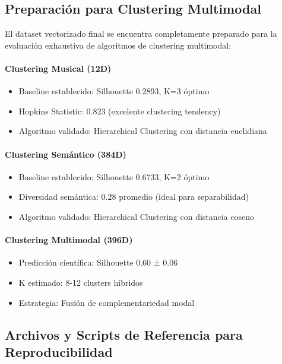 \documentclass[12pt,a4paper]{article}
\begin{document}
\subsection{Preparación para Clustering Multimodal}

El dataset vectorizado final se encuentra completamente preparado para la evaluación exhaustiva de algoritmos de clustering multimodal:

\paragraph{Clustering Musical (12D)}
\begin{itemize}
    \item Baseline establecido: Silhouette 0.2893, K=3 óptimo
    \item Hopkins Statistic: 0.823 (excelente clustering tendency)
    \item Algoritmo validado: Hierarchical Clustering con distancia euclidiana
\end{itemize}

\paragraph{Clustering Semántico (384D)}
\begin{itemize}
    \item Baseline establecido: Silhouette 0.6733, K=2 óptimo
    \item Diversidad semántica: 0.28 promedio (ideal para separabilidad)
    \item Algoritmo validado: Hierarchical Clustering con distancia coseno
\end{itemize}

\paragraph{Clustering Multimodal (396D)}
\begin{itemize}
    \item Predicción científica: Silhouette 0.60 ± 0.06
    \item K estimado: 8-12 clusters híbridos
    \item Estrategia: Fusión de complementariedad modal
\end{itemize}

\subsection{Archivos y Scripts de Referencia para Reproducibilidad}
\end{document}
